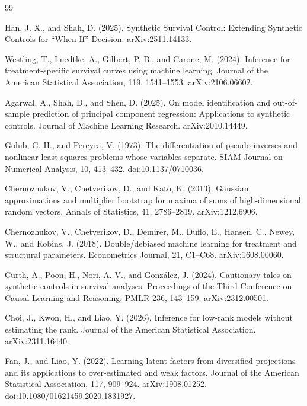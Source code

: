 \documentclass{article}
\begin{document}
\begin{thebibliography}{99}

   Han, J. X., and Shah, D. (2025). Synthetic Survival Control: Extending Synthetic Controls for ``When-If'' Decision. arXiv:2511.14133.

   Westling, T., Luedtke, A., Gilbert, P. B., and Carone, M. (2024). Inference for treatment-specific survival curves using machine learning. Journal of the American Statistical Association, 119, 1541--1553. arXiv:2106.06602.

   Agarwal, A., Shah, D., and Shen, D. (2025). On model identification and out-of-sample prediction of principal component regression: Applications to synthetic controls. Journal of Machine Learning Research. arXiv:2010.14449.

   Golub, G. H., and Pereyra, V. (1973). The differentiation of pseudo-inverses and nonlinear least squares problems whose variables separate. SIAM Journal on Numerical Analysis, 10, 413--432. doi:10.1137/0710036.

   Chernozhukov, V., Chetverikov, D., and Kato, K. (2013). Gaussian approximations and multiplier bootstrap for maxima of sums of high-dimensional random vectors. Annals of Statistics, 41, 2786--2819. arXiv:1212.6906.

   Chernozhukov, V., Chetverikov, D., Demirer, M., Duflo, E., Hansen, C., Newey, W., and Robins, J. (2018). Double/debiased machine learning for treatment and structural parameters. Econometrics Journal, 21, C1--C68. arXiv:1608.00060.

   Curth, A., Poon, H., Nori, A. V., and Gonz\'alez, J. (2024). Cautionary tales on synthetic controls in survival analyses. Proceedings of the Third Conference on Causal Learning and Reasoning, PMLR 236, 143--159. arXiv:2312.00501.

   Choi, J., Kwon, H., and Liao, Y. (2026). Inference for low-rank models without estimating the rank. Journal of the American Statistical Association. arXiv:2311.16440.

   Fan, J., and Liao, Y. (2022). Learning latent factors from diversified projections and its applications to over-estimated and weak factors. Journal of the American Statistical Association, 117, 909--924. arXiv:1908.01252. doi:10.1080/01621459.2020.1831927.


\end{thebibliography}
\end{document}
